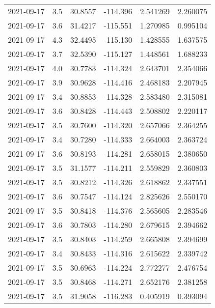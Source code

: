 \begin{tabular}{lrrrrr}
2021-09-17 &       3.5 &  30.8557 &  -114.396 &         2.541269 &         2.260075 \\
2021-09-17 &       3.6 &  31.4217 &  -115.551 &         1.270985 &         0.995104 \\
2021-09-17 &       4.3 &  32.4495 &  -115.130 &         1.428555 &         1.637575 \\
2021-09-17 &       3.7 &  32.5390 &  -115.127 &         1.448561 &         1.688233 \\
2021-09-17 &       4.0 &  30.7783 &  -114.324 &         2.643701 &         2.354066 \\
2021-09-17 &       3.9 &  30.9628 &  -114.416 &         2.468183 &         2.207945 \\
2021-09-17 &       3.4 &  30.8853 &  -114.328 &         2.583480 &         2.315081 \\
2021-09-17 &       3.6 &  30.8428 &  -114.443 &         2.508802 &         2.220117 \\
2021-09-17 &       3.5 &  30.7600 &  -114.320 &         2.657066 &         2.364255 \\
2021-09-17 &       3.4 &  30.7280 &  -114.333 &         2.664003 &         2.363724 \\
2021-09-17 &       3.6 &  30.8193 &  -114.281 &         2.658015 &         2.380650 \\
2021-09-17 &       3.5 &  31.1577 &  -114.211 &         2.559829 &         2.360803 \\
2021-09-17 &       3.5 &  30.8212 &  -114.326 &         2.618862 &         2.337551 \\
2021-09-17 &       3.6 &  30.7547 &  -114.124 &         2.825626 &         2.550170 \\
2021-09-17 &       3.5 &  30.8418 &  -114.376 &         2.565605 &         2.283546 \\
2021-09-17 &       3.6 &  30.7803 &  -114.280 &         2.679615 &         2.394662 \\
2021-09-17 &       3.5 &  30.8403 &  -114.259 &         2.665808 &         2.394699 \\
2021-09-17 &       3.4 &  30.8433 &  -114.316 &         2.615622 &         2.339742 \\
2021-09-17 &       3.5 &  30.6963 &  -114.224 &         2.772277 &         2.476754 \\
2021-09-17 &       3.5 &  30.8468 &  -114.271 &         2.652176 &         2.381258 \\
2021-09-17 &       3.5 &  31.9058 &  -116.283 &         0.405919 &         0.393094 \\

\end{tabular}
